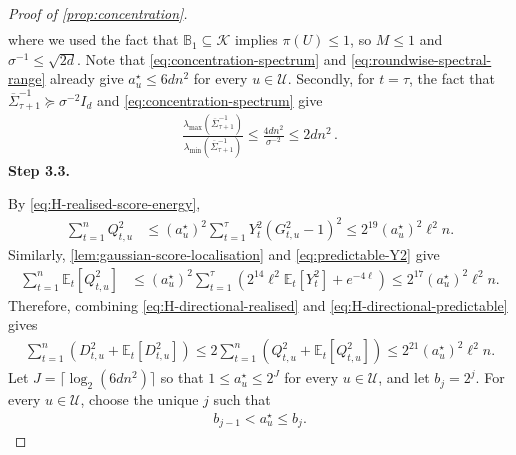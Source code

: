 \documentclass[11pt]{article}
\newcommand{\proofstepinline}[1]{%
    {\sffamily\bfseries\color{blue!55!black}Step #1.}\enspace
}
\newcommand{\E}{\mathbb E}
\newcommand{\K}{\mathcal K}
\newcommand{\1}{\mathbf 1}
\begin{document}
\begin{proof}[Proof of \cref{prop:concentration}]
\begin{align}
        \label{eq:concentration-spectrum}
    \end{align}
    where we used the fact that $\mathbb{B}_1\subseteq\K$ implies $\pi(U)\leq1$, so
    $M\leq1$ and $\sigma^{-1}\leq\sqrt{2d}$.
    Note that \eqref{eq:concentration-spectrum} and \eqref{eq:roundwise-spectral-range} already give
    $a_u^\star\leq 6dn^2$ for every $u\in\mathcal U$.
    Secondly, for $t=\tau$, the fact that
    $\overline\Sigma_{\tau+1}^{-1}\succeq\sigma^{-2}I_d$ and
    \eqref{eq:concentration-spectrum}
    give
    \begin{align}
        \frac{
            \lambda_{\max}(\overline\Sigma_{\tau+1}^{-1})
        }{
            \lambda_{\min}(\overline\Sigma_{\tau+1}^{-1})
        }
        \leq \frac{
            4dn^2
        }{
            \sigma^{-2}
        }
        \leq
        2 d n^2
        \,.
    \end{align}
    \proofstepinline{3.3}
    By \eqref{eq:H-realised-score-energy},
    \begin{align}
        \sum_{t=1}^nQ_{t,u}^2
         & \leq
        (a_u^\star)^2
        \sum_{t=1}^{\tau}
        Y_t^2(G_{t,u}^2-1)^2
        \leq
        2^{19}(a_u^\star)^2\ell^2n.
        \label{eq:H-directional-realised}
    \end{align}
    Similarly, \cref{lem:gaussian-score-localisation} and
    \eqref{eq:predictable-Y2} give
    \begin{align}
        \sum_{t=1}^n\E_t[Q_{t,u}^2]
         & \leq
        (a_u^\star)^2
        \sum_{t=1}^{\tau}
        \left(
        2^{14}\ell^2\E_t[Y_t^2]+e^{-4\ell}
        \right)
        \leq
        2^{17}(a_u^\star)^2\ell^2n.
        \label{eq:H-directional-predictable}
    \end{align}
    Therefore, combining \eqref{eq:H-directional-realised} and
    \eqref{eq:H-directional-predictable} gives
    \begin{align}
        \sum_{t=1}^n
        \left(
        D_{t,u}^2+\E_t[D_{t,u}^2]
        \right)
        \leq
        2
        \sum_{t=1}^n
        \left(
        Q_{t,u}^2+\E_t[Q_{t,u}^2]
        \right)
        \leq
        2^{21}(a_u^\star)^2\ell^2n.
        \label{eq:H-directional-self-normaliser}
    \end{align}
    Let $J = \lceil \log_2(6dn^2) \rceil$
    so that $1\leq a_u^\star \leq 2^J$ for every $u\in\mathcal U$,
    and let $b_j=2^j$.
    For every $u\in\mathcal U$, choose the unique $j$ such that
    \begin{align}
        b_{j-1}<a_u^\star\leq b_j.

\end{align}
\end{proof}
\end{document}
